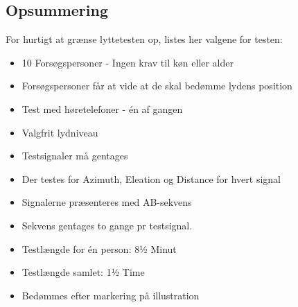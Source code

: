 \subsection{Opsummering}

For hurtigt at grænse lyttetesten op, listes her valgene for testen:

\begin{itemize}
	\item 10 Forsøgspersoner - Ingen krav til køn eller alder
	\item Forsøgspersoner får at vide at de skal bedømme lydens position
	\item Test med høretelefoner - én af gangen
	\item Valgfrit lydniveau
	\item Testsignaler må gentages
	\item Der testes for Azimuth, Eleation og Distance for hvert signal
	\item Signalerne præsenteres med AB-sekvens
	\item Sekvens gentages to gange pr testsignal.
	\item Testlængde for én person: 8½ Minut
	\item Testlængde samlet: 1½ Time
	\item Bedømmes efter markering på illustration
	
\end{itemize}


